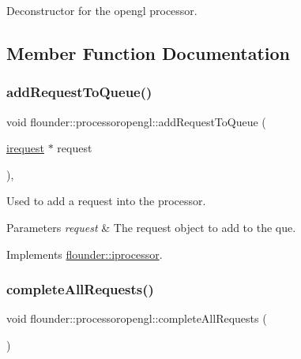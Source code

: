 Deconstructor for the opengl processor. 



\subsection{Member Function Documentation}
\mbox{\label{classflounder_1_1processoropengl_a5063ad5c1f350f26733a748a7e039a9a}} 
\subsubsection{\texorpdfstring{add\+Request\+To\+Queue()}{addRequestToQueue()}}
{\footnotesize\ttfamily void flounder\+::processoropengl\+::add\+Request\+To\+Queue (\begin{DoxyParamCaption}\item[{\hyperlink{classflounder_1_1irequest}{irequest} $\ast$}]{request }\end{DoxyParamCaption})\hspace{0.3cm}{\ttfamily [override]}, {\ttfamily [virtual]}}



Used to add a request into the processor. 


\begin{DoxyParams}{Parameters}
{\em request} & The request object to add to the que. \\
\hline
\end{DoxyParams}


Implements \hyperlink{classflounder_1_1iprocessor_ad721814a6a2c69f526527c7b2f57a11b}{flounder\+::iprocessor}.

\mbox{\label{classflounder_1_1processoropengl_aa1c943138ae967f19584b7841afdfa2a}} 
\subsubsection{\texorpdfstring{complete\+All\+Requests()}{completeAllRequests()}}
{\footnotesize\ttfamily void flounder\+::processoropengl\+::complete\+All\+Requests (\begin{DoxyParamCaption}{ }\end{DoxyParamCaption})}



